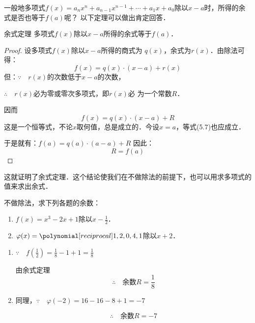 一般地多项式$f(x)=a_n x^n +a_{n-1}x^{n-1}+\cdots+a_1x+a_0$除以$x-a$时，所得的余式是否也等于$f(a)$呢？
以下定理可以做出肯定回答．

\begin{blk}{余式定理}
多项式$f(x)$除以$x-a$所得的余式等于$f(a)$．    
\end{blk}

\begin{proof}
    设多项式$f(x)$除以$x-a$所得的商式为
$q(x)$，余式为$r(x)$．由除法可得：
\[f (x) =q (x)\cdot  (x-a)+r(x)\]
但：$\because\quad r(x)$的次数低于$x-a$的次数，

$\therefore\quad r(x)$必为零或零次多项式，即$r(x)$必
    为一个常数$R$．

因而
\begin{equation}
    f (x) =q (x) \cdot  (x-a) +R
\end{equation}
这是一个恒等式，不论$x$取何值，总是成立的．今设$x=a$，等式(5.7)也应成立．

    于是就有：$f(a)=q(a)\cdot (a-a)+R$
因此： 
\begin{equation}
   R=f (a)  
\end{equation}
\end{proof}

    这就证明了余式定理．这个结论使我们在不做除法的前提下，也可以用求多项式的值来求出余式．


\begin{example}
  不做除法，求下列各题的余数：
  \begin{enumerate}
      \item $f(x)=x^3-2x+1$除以$x-\frac{1}{2}$．
      \item $\varphi(x)=\poly{1,2,0,4,1}$除以$x+2$．
  \end{enumerate}
\end{example}    
    


\begin{solution}
\begin{enumerate}
    \item $\because\quad f\left(\frac{1}{2}\right)=\frac{1}{8}-1+1=\frac{1}{8}$
    
    由余式定理
    \[\therefore\quad \text{余数}R=\frac{1}{8}\]

\item 同理，$\because\quad \varphi(-2)=16-16-8+1=-7$

\[\therefore\quad \text{余数}R=-7\]
\end{enumerate}

    
\end{solution}


